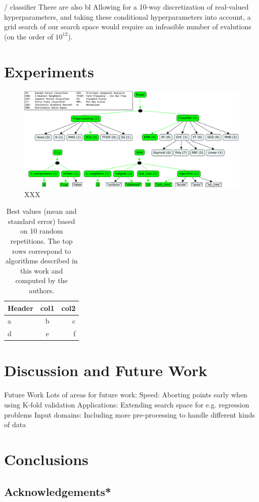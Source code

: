 \documentclass[wcp]{jmlr}
\begin{document}
/ classifier
There are also bl
Allowing for a 10-way discretization of real-valued hyperparameters, and taking these conditional hyperparameters into account, a grid search of our search space would require an infeasible number of evalutions (on the order of $10^{12}$).



\section{Experiments}

\begin{figure}
    \centering
    \includegraphics[width=\textwidth]{graphics/sklearn_space_all_together}
    \caption{
	    XXX
    }
    \label{fig:boxplots}
\end{figure}



\begin{table}
    \caption{
        Best values (mean and standard error) based on 10 random repetitions.
        The top rows correspond to algorithms described in this work and computed by the authors.
    }
    \label{tbl:acc}
    \centering
    \small
    \begin{tabular}{l|cr}
        \hline
        Header & col1 & col2 \\
        \hline
        a & b & c \\
        d & e & f
    \end{tabular}
\end{table}



\section{Discussion and Future Work}
Future Work
Lots of areas for future work:
Speed: Aborting points early when using K-fold validation
Applications: Extending search space for e.g. regression problems
Input domains: Including more pre-processing to handle different kinds of data


\section{Conclusions}


\subsection{Acknowledgements*}


\end{document}
